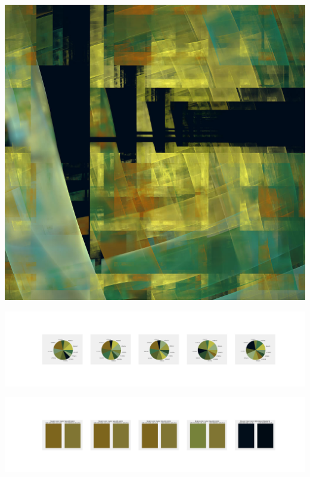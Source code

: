 \documentclass[11pt]{article}
\begin{document}
\begin{landscape}
    \begin{center}
    \includegraphics[width=\textwidth]{./nbimg/file (214).jpg}
    \end{center}

    \begin{center}
    \includegraphics[width=250mm]{./nbimg/pie-128.jpg}
    \end{center}

    \begin{center}
    \includegraphics[width=250mm]{./nbimg/peak-128.jpg}
    \end{center}
    


\end{landscape}
\end{document}
